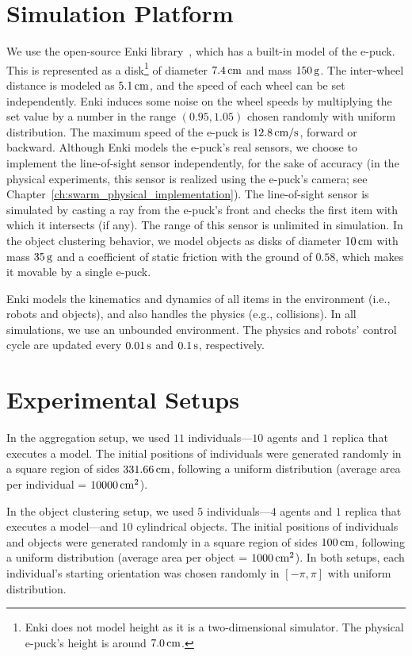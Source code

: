 \section{Simulation Platform}\label{sec:simulation_platform}

We use the open-source Enki library~\cite{Enki}, which has a built-in model of the e-puck. This is represented as a disk\footnote{Enki does not model height as it is a two-dimensional simulator. The physical e-puck's height is around $\unit[7.0]{cm}$.} of diameter $\unit[7.4]{cm}$ and mass $\unit[150]{g}$. The inter-wheel distance is modeled as $\unit[5.1]{cm}$, and the speed of each wheel can be set independently. Enki induces some noise on the wheel speeds by multiplying the set value by a number in the range $(0.95, 1.05)$ chosen randomly with uniform distribution. The maximum speed of the e-puck is $\unit[12.8]{\textrm{cm/s}}$, forward or backward. Although Enki models the e-puck's real sensors, we choose to implement the line-of-sight sensor independently, for the sake of accuracy (in the physical experiments, this sensor is realized using the e-puck's camera; see Chapter~\ref{ch:swarm_physical_implementation}). The line-of-sight sensor is simulated by casting a ray from the e-puck's front and checks the first item with which it intersects (if any). The range of this sensor is unlimited in simulation. In the object clustering behavior, we model objects as disks of diameter $\unit[10]{cm}$ with mass $\unit[35]{g}$ and a coefficient of static friction with the ground of $0.58$, which makes it movable by a single e-puck.

Enki models the kinematics and dynamics of all items in the environment (i.e., robots and objects), and also handles the physics (e.g., collisions). In all simulations, we use an unbounded environment. The physics and robots' control cycle are updated every $\unit[0.01]{s}$ and $\unit[0.1]{s}$, respectively.

\section{Experimental Setups}\label{sec:simulation_setup}
In the aggregation setup, we used $11$ individuals---$10$ agents and $1$ replica that executes a model. The initial positions of individuals were generated randomly in a square region of sides $\unit[331.66]{cm}$, following a uniform distribution (average area per individual = $\unit[10000]{cm^2}$). 

In the object clustering setup, we used $5$ individuals---$4$ agents and $1$ replica that executes a model---and $10$ cylindrical objects. The initial positions of individuals and objects were generated randomly in a square region of sides $\unit[100]{cm}$, following a uniform distribution (average area per object = $\unit[1000]{cm^2}$). In both setups, each individual's starting orientation was chosen randomly in $[-\pi,\pi]$ with uniform distribution.

